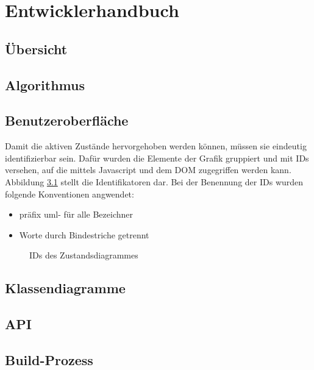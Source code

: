 \part{Entwicklerhandbuch}

\chapter{Übersicht}
\chapter{Algorithmus}
\chapter{Benutzeroberfläche}
Damit die aktiven Zustände hervorgehoben werden können, müssen sie eindeutig identifizierbar sein. Dafür wurden die Elemente der Grafik gruppiert und mit IDs versehen, auf die mittels Javascript und dem \acrshort{DOM} zugegriffen werden kann. Abbildung \ref{fig:ZD_id_view} stellt die Identifikatoren dar. Bei der Benennung der IDs wurden folgende Konventionen angwendet:
\begin{itemize}
 \item präfix uml- für alle Bezeichner
 \item Worte durch Bindestriche getrennt
\end{itemize}

\begin{figure}[hbt]
\centering
\caption{IDs des Zustandsdiagrammes}%
\label{fig:ZD_id_view}%
\end{figure}
\chapter{Klassendiagramme}
\chapter{API}
\chapter{Build-Prozess}

